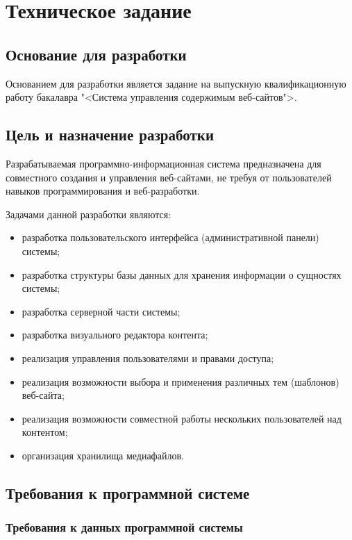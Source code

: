 \section{Техническое задание}
\subsection{Основание для разработки}

Основанием для разработки является задание на выпускную квалификационную работу бакалавра "<Система управления содержимым веб-сайтов">.

\subsection{Цель и назначение разработки}

Разрабатываемая программно-информационная система предназначена для совместного создания и управления веб-сайтами, не требуя от пользователей навыков программирования и веб-разработки. 

Задачами данной разработки являются:
\begin{itemize}
	\item разработка пользовательского интерфейса (административной панели) системы;
	\item разработка структуры базы данных для хранения информации о сущностях системы;
	\item разработка серверной части системы;
	\item разработка визуального редактора контента;
	\item реализация управления пользователями и правами доступа;
	\item реализация возможности выбора и применения различных тем (шаблонов) веб-сайта;
	\item реализация возможности совместной работы нескольких пользователей над контентом;
	\item организация хранилища медиафайлов.
\end{itemize}

\subsection{Требования к программной системе}
\subsubsection{Требования к данных программной системы}

